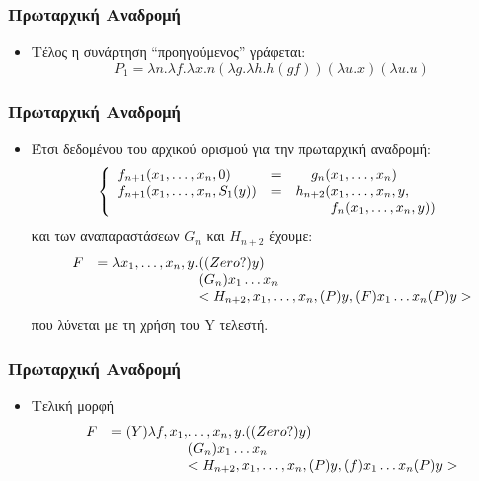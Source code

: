 \documentclass{beamer}
\begin{document}
\begin{frame}
        \frametitle{Πρωταρχική Αναδρομή}
        \begin{itemize}
        	\item Τέλος η συνάρτηση ``προηγούμενος'' γράφεται:
        	$$ P_1 = \lambda n. \lambda f. \lambda x. n (\lambda g. \lambda h. h (g f)) (\lambda u.x) (\lambda u. u) $$
        \end{itemize}
\end{frame}
\begin{frame}
        \frametitle{Πρωταρχική Αναδρομή}
        \begin{itemize}
        	\item Έτσι δεδομένου του αρχικού ορισμού για την πρωταρχική αναδρομή:
                $$\left\{
                    \begin{array}{llr@{}l}
                      f_{n+1}(x_1,\ldots,x_n, 0)     &=&    g_n(&x_1,\ldots,x_n) \\
                      f_{n+1}(x_1,\ldots,x_n, S_1(y))&=&h_{n+2}(&x_1,\ldots,x_n, y ,\\
                                                     & &        &f_n(x_1,\ldots,x_n, y))
                    \end{array}
                \right.$$
                και των αναπαραστάσεων $G_n$ και $H_{n+2}$
                \pause
           		έχουμε:
           		$$ \begin{array}{lr@{}l}
           		F &= \lambda x_1,\ldots ,x_n, y .&((Zero?)y) \\
           		  &                              &(G_n)x_1 \ldots x_n \\
           		  &                              &<H_{n+2},x_1,\ldots,x_n,(P)y,(F)x_1 \ldots x_n (P)y>
           		\end{array}$$
           		\pause
           		που λύνεται με τη χρήση του Y τελεστή.
        \end{itemize}
\end{frame}

\begin{frame}
        \frametitle{Πρωταρχική Αναδρομή}
        \begin{itemize}
        	\item Τελική μορφή
           		$$ \begin{array}{lr@{}l}
           		F &= (Y)\lambda f,x_1,&\ldots ,x_n, y .((Zero?)y) \\
           		  &                                   &(G_n)x_1 \ldots x_n \\
           		  &                                   &<H_{n+2},x_1,\ldots,x_n,(P)y,(f)x_1 \ldots x_n (P)y>
           		\end{array}$$
        \end{itemize}
\end{frame}
\end{document}
